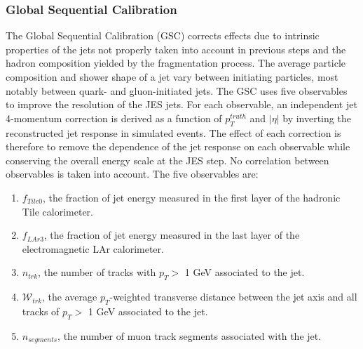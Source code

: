 \subsubsection{Global Sequential Calibration}
\label{Jet:Cal:chain:GSC}
The Global Sequential Calibration (GSC) corrects effects due to intrinsic properties of the jets not properly taken into account in previous steps and the hadron composition yielded by the fragmentation process. The average particle composition and shower shape of a jet vary between initiating particles, most notably between quark- and gluon-initiated jets. The GSC uses five observables to improve the resolution of the JES jets. For each observable, an independent jet 4-momentum correction is derived as a function of $p_{T}^{truth}$ and $|\eta|$ by inverting the reconstructed jet response in simulated events. The effect of each correction is therefore to remove the dependence of the jet response on each observable while conserving the overall energy scale at the JES step. No correlation between observables is taken into account. The five observables are:
\begin{enumerate}
    \item $f_{Tile0}$, the fraction of jet energy measured in the first layer of the hadronic Tile calorimeter.
    \item $f_{LAr3}$, the fraction of jet energy measured in the last layer of the electromagnetic LAr calorimeter.
    \item $n_{trk}$, the number of tracks with $p_T>$ 1 GeV associated to the jet.
    \item $\mathcal{W}_{trk}$, the average $p_T$-weighted transverse distance between the jet axis and all tracks of $p_T>$ 1 GeV associated to the jet.
    \item $n_{segments}$, the number of muon track segments associated with the jet.
\end{enumerate}


